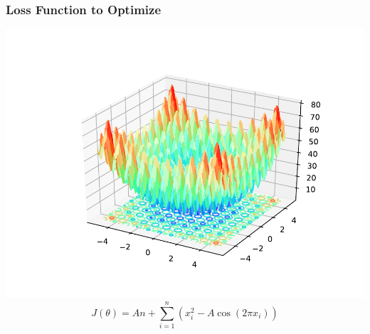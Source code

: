 \documentclass{beamer}
\begin{document}
\begin{frame}
\frametitle{Loss Function to Optimize}
\begin{center}
\includegraphics[scale=0.5]{assets/rastrigin}
$$J(\theta) = An + \sum_{i=1}^n \left( x_i^2 - A \cos(2 \pi x_i) \right)$$
\end{center}
\end{frame}
\end{document}
